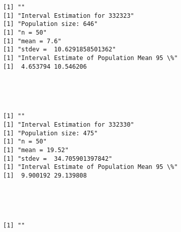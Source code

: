 \documentclass[11pt]{article}
\begin{document}
    \begin{Verbatim}[commandchars=\\\{\}]
[1] ""
[1] "Interval Estimation for 332323"
[1] "Population size: 646"
[1] "n = 50"
[1] "mean = 7.6"
[1] "stdev =  10.6291858501362"
[1] "Interval Estimate of Population Mean 95 \%"
[1]  4.653794 10.546206

    \end{Verbatim}

    \begin{center}
    \end{center}
    { \hspace*{\fill} \\}
    
    \begin{center}
    \end{center}
    { \hspace*{\fill} \\}
    
    \begin{Verbatim}[commandchars=\\\{\}]
[1] ""
[1] "Interval Estimation for 332330"
[1] "Population size: 475"
[1] "n = 50"
[1] "mean = 19.52"
[1] "stdev =  34.705901397842"
[1] "Interval Estimate of Population Mean 95 \%"
[1]  9.900192 29.139808

    \end{Verbatim}

    \begin{center}
    \end{center}
    { \hspace*{\fill} \\}
    
    \begin{center}
    \end{center}
    { \hspace*{\fill} \\}
    
    \begin{Verbatim}[commandchars=\\\{\}]
[1] ""

    \end{Verbatim}

    \begin{center}
    \end{center}
    { \hspace*{\fill} \\}
    
\end{document}
